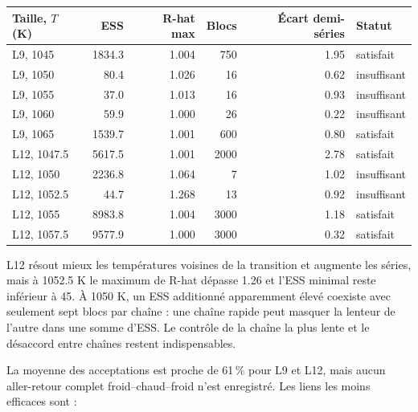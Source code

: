 
\begin{center}\small\begin{tabular}{lrrrrl}\toprule

Taille, $T$ (K) & ESS & R-hat max & Blocs & Écart demi-séries & Statut\\\midrule

L9, 1045 & 1834.3 & 1.004 & 750 & 1.95 & satisfait\\

L9, 1050 & 80.4 & 1.026 & 16 & 0.62 & insuffisant\\

L9, 1055 & 37.0 & 1.013 & 16 & 0.93 & insuffisant\\

L9, 1060 & 59.9 & 1.000 & 26 & 0.22 & insuffisant\\

L9, 1065 & 1539.7 & 1.001 & 600 & 0.80 & satisfait\\

L12, 1047.5 & 5617.5 & 1.001 & 2000 & 2.78 & satisfait\\

L12, 1050 & 2236.8 & 1.064 & 7 & 1.02 & insuffisant\\

L12, 1052.5 & 44.7 & 1.268 & 13 & 0.92 & insuffisant\\

L12, 1055 & 8983.8 & 1.004 & 3000 & 1.18 & satisfait\\

L12, 1057.5 & 9577.9 & 1.000 & 3000 & 0.32 & satisfait\\

\bottomrule\end{tabular}\end{center}

L12 résout mieux les températures voisines de la transition et augmente les séries, mais à 1052.5 K le maximum de R-hat dépasse 1.26 et l’ESS minimal reste inférieur à 45. À 1050 K, un ESS additionné apparemment élevé coexiste avec seulement sept blocs par chaîne : une chaîne rapide peut masquer la lenteur de l’autre dans une somme d’ESS. Le contrôle de la chaîne la plus lente et le désaccord entre chaînes restent indispensables.

La moyenne des acceptations est proche de 61\,\% pour L9 et L12, mais aucun aller-retour complet froid--chaud--froid n’est enregistré. Les liens les moins efficaces sont :

